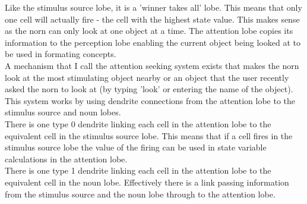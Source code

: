 \documentclass[11pt,twoside,a4paper]{article}
\begin{document}
Like the stimulus source lobe, it is a 'winner takes all' lobe. This means that only one cell will actually fire - the cell with the highest state value. This makes sense as the norn can only look at one object at a time. The attention lobe copies its information to the perception lobe enabling the current object being looked at to be used in formating concepts.~\\

A mechanism that I call the attention seeking system exists that makes the norn look at the most stimulating object nearby or an object that the user recently asked the norn to look at (by typing 'look' or entering the name of the object). This system works by using dendrite connections from the attention lobe to the stimulus source and noun lobes.~\\

There is one type 0 dendrite linking each cell in the attention lobe to the equivalent cell in the stimulus source lobe. This means that if a cell fires in the stimulus source lobe the value of the firing can be used in state variable calculations in the attention lobe.~\\

There is one type 1 dendrite linking each cell in the attention lobe to the equivalent cell in the noun lobe. Effectively there is a link passing information from the stimulus source and the noun lobe through to the attention lobe.


\end{document}

